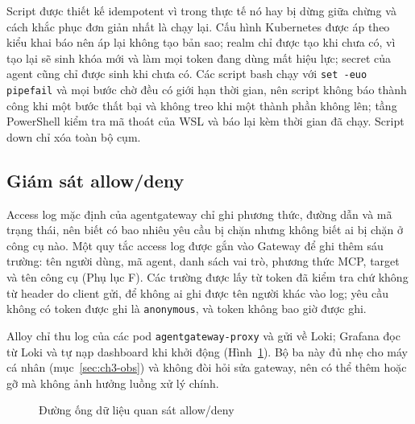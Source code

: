 Script được thiết kế idempotent vì trong thực tế nó hay bị dừng giữa chừng và cách khắc phục đơn giản nhất là chạy lại. Cấu hình Kubernetes được áp theo kiểu khai báo nên áp lại không tạo bản sao; realm chỉ được tạo khi chưa có, vì tạo lại sẽ sinh khóa mới và làm mọi token đang dùng mất hiệu lực; secret của agent cũng chỉ được sinh khi chưa có. Các script bash chạy với \texttt{set -euo pipefail} và mọi bước chờ đều có giới hạn thời gian, nên script không báo thành công khi một bước thất bại và không treo khi một thành phần không lên; tầng PowerShell kiểm tra mã thoát của WSL và báo lại kèm thời gian đã chạy. Script down chỉ xóa toàn bộ cụm.

\subsection{Giám sát allow/deny}\label{sec:obs}

Access log mặc định của agentgateway chỉ ghi phương thức, đường dẫn và mã trạng thái, nên biết có bao nhiêu yêu cầu bị chặn nhưng không biết ai bị chặn ở công cụ nào. Một quy tắc access log được gắn vào Gateway để ghi thêm sáu trường: tên người dùng, mã agent, danh sách vai trò, phương thức MCP, target và tên công cụ (Phụ lục F). Các trường được lấy từ token đã kiểm tra chứ không từ header do client gửi, để không ai ghi được tên người khác vào log; yêu cầu không có token được ghi là \texttt{anonymous}, và token không bao giờ được ghi.

Alloy chỉ thu log của các pod \texttt{agentgateway-proxy} và gửi về Loki; Grafana đọc từ Loki và tự nạp dashboard khi khởi động (Hình~\ref{fig:obs}). Bộ ba này đủ nhẹ cho máy cá nhân (mục~\ref{sec:ch3-obs}) và không đòi hỏi sửa gateway, nên có thể thêm hoặc gỡ mà không ảnh hưởng luồng xử lý chính.

\begin{figure}[htbp]\centering
{}
\caption{Đường ống dữ liệu quan sát allow/deny}\label{fig:obs}\end{figure}


